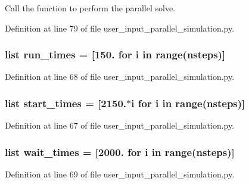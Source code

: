 Call the function to perform the parallel solve. 



Definition at line 79 of file user\-\_\-input\-\_\-parallel\-\_\-simulation.\-py.

\hypertarget{namespaceuser__input__parallel__simulation_a5a6deb885420d2b81e210e580767b1c1}{
\subsubsection[{run\-\_\-times}]{\setlength{\rightskip}{0pt plus 5cm}list run\-\_\-times = \mbox{[}150. for i in range({\bf nsteps})\mbox{]}}}\label{namespaceuser__input__parallel__simulation_a5a6deb885420d2b81e210e580767b1c1}


Definition at line 68 of file user\-\_\-input\-\_\-parallel\-\_\-simulation.\-py.

\hypertarget{namespaceuser__input__parallel__simulation_a377a515511d37e8c7ac5501847d6485d}{
\subsubsection[{start\-\_\-times}]{\setlength{\rightskip}{0pt plus 5cm}list start\-\_\-times = \mbox{[}2150.$\ast$i for i in range({\bf nsteps})\mbox{]}}}\label{namespaceuser__input__parallel__simulation_a377a515511d37e8c7ac5501847d6485d}


Definition at line 67 of file user\-\_\-input\-\_\-parallel\-\_\-simulation.\-py.

\hypertarget{namespaceuser__input__parallel__simulation_ae584b229c7b1ea3d8330e6038884ffd3}{
\subsubsection[{wait\-\_\-times}]{\setlength{\rightskip}{0pt plus 5cm}list wait\-\_\-times = \mbox{[}2000. for i in range({\bf nsteps})\mbox{]}}}\label{namespaceuser__input__parallel__simulation_ae584b229c7b1ea3d8330e6038884ffd3}


Definition at line 69 of file user\-\_\-input\-\_\-parallel\-\_\-simulation.\-py.

